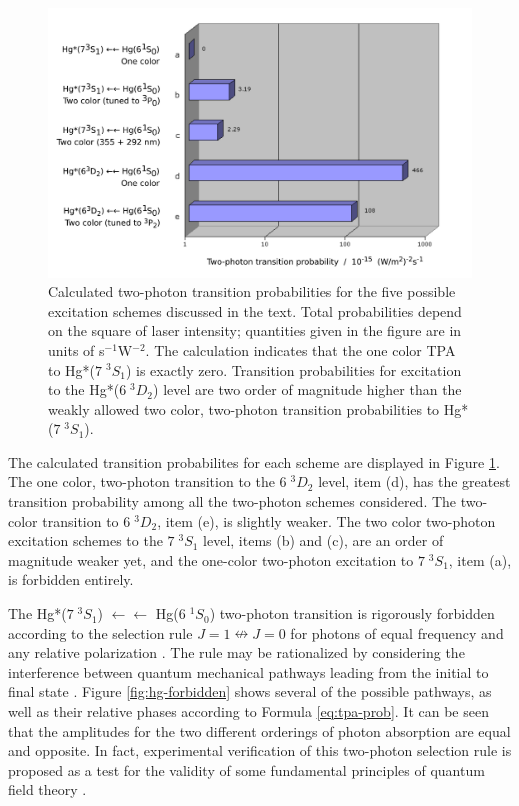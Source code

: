\documentclass[12pt]{mitthesis}
\begin{document}
\begin{figure}
  \caption{Calculated two-photon transition probabilities for the five
    possible excitation schemes discussed in the text.  Total
    probabilities depend on the square of laser intensity; quantities
    given in the figure are in units of s$^{-1}$W$^{-2}$.  The
    calculation indicates that the one color TPA to Hg*($7 \; ^3S_1$)
    is exactly zero.  Transition probabilities for excitation to the
    Hg*($6 \; ^3D_2$) level are two order of magnitude higher than the
    weakly allowed two color, two-photon transition probabilities to
    Hg*($7 \; ^3S_1$).}
  \label{fig:tpa-prob}
  \centering
  \includegraphics[width=7in,angle=90]{tpt-probs.pdf}
\end{figure}

The calculated transition probabilites for each scheme are displayed
in Figure \ref{fig:tpa-prob}.  The one color, two-photon transition to
the $6 \; ^3D_2$ level, item (d), has the greatest transition
probability among all the two-photon schemes considered.  The
two-color transition to $6 \; ^3D_2$, item (e), is slightly weaker.
The two color two-photon excitation schemes to the $7 \; ^3S_1$ level,
items (b) and (c), are an order of magnitude weaker yet, and the
one-color two-photon excitation to $7 \; ^3S_1$, item (a), is
forbidden entirely.

The Hg*($7 \; ^3S_1$) $\leftarrow\leftarrow$ Hg($6 \; ^1S_0$)
two-photon transition is rigorously forbidden according to the
selection rule $J=1 \nleftrightarrow J=0$ for photons of equal
frequency and any relative polarization \cite{bonin84}.  The rule may
be rationalized by considering the interference between quantum
mechanical pathways leading from the initial to final state
\cite{bonin84, grynberg77}.  Figure \ref{fig:hg-forbidden} shows
several of the possible pathways, as well as their relative phases
according to Formula \ref{eq:tpa-prob}.  It can be seen that the
amplitudes for the two different orderings of photon absorption are
equal and opposite.  In fact, experimental verification of this
two-photon selection rule is proposed as a test for the validity of
some fundamental principles of quantum field theory \cite{hilborn02}.
\end{document}
